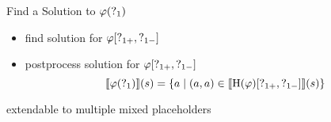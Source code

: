 \begin{frame}{Find a Solution to $\varphi(\operatorname{?}_1)$}
  \begin{itemize}
    \item find solution for $\varphi[\operatorname{?}_{1+},\operatorname{?}_{1-}]$
    \item postprocess solution for $\varphi[\operatorname{?}_{1+},\operatorname{?}_{1-}]$
      \[
        \llbracket \varphi(\operatorname{?}_1) \rrbracket (s) = \{ a \mid (a,a) \in 
          \llbracket \operatorname{H} (\varphi)[\operatorname{?}_{1+},\operatorname{?}_{1-}] \rrbracket (s) \}
      \]
  \end{itemize}
  
  extendable to multiple mixed placeholders
\end{frame}
